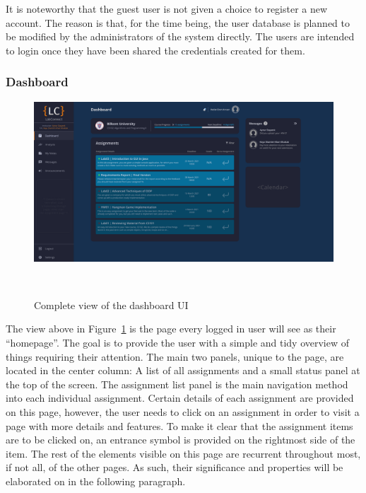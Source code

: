 \documentclass[a4paper, 12pt]{article}
\begin{document}
    It is noteworthy that the guest user is not given a choice to register a new account.
    The reason is that, for the time being, the user database is planned to be modified by the administrators of the system directly.
    The users are intended to login once they have been shared the credentials created for them.

    \pagebreak

    \subsubsection{Dashboard}

    \begin{figure}[H]
        \centering
        \includegraphics[width=\textwidth]{main_dashboard}
        \caption{Complete view of the dashboard UI}~\label{fig:dashboard_full}
    \end{figure}

    The view above in Figure~\ref{fig:dashboard_full} is the page every logged in user will see as their ``homepage''.
    The goal is to provide the user with a simple and tidy overview of things requiring their attention.
    The main two panels, unique to the page, are located in the center column: A list of all assignments and a small
    status panel at the top of the screen. The assignment list panel is the main navigation method into each individual
    assignment. Certain details of each assignment are provided on this page, however, the user needs to click on an
    assignment in order to visit a page with more details and features. To make it clear that the assignment items are
    to be clicked on, an entrance symbol is provided on the rightmost side of the item.
    The rest of the elements visible on this page are recurrent throughout most, if not all, of the other pages.
    As such, their significance and properties will be elaborated on in the following paragraph.
\end{document}
